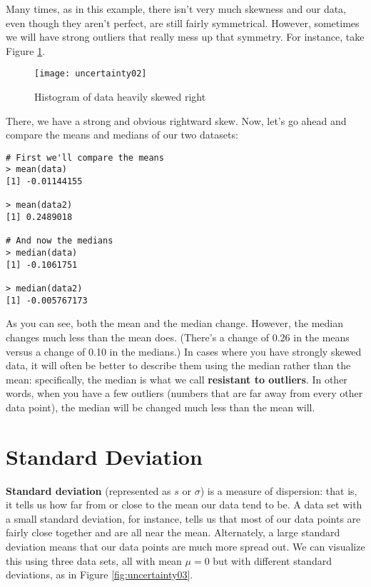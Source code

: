Many times, as in this example, there isn't very much skewness and our data, even though they aren't perfect, are still fairly symmetrical. However, sometimes we will have strong outliers that really mess up that symmetry. For instance, take Figure \ref{fig:uncertainty02}.

\begin{figure}[h!]
\texttt{[image: uncertainty02]}
\caption{Histogram of data heavily skewed right}
\label{fig:uncertainty02}
\end{figure}

There, we have a strong and obvious rightward skew. Now, let's go ahead and compare the means and medians of our two datasets:

\begin{framed}
\begin{Verbatim}[samepage=TRUE]
# First we'll compare the means
> mean(data)
[1] -0.01144155
 
> mean(data2)
[1] 0.2489018
 
# And now the medians
> median(data)
[1] -0.1061751
 
> median(data2)
[1] -0.005767173
\end{Verbatim}
\end{framed}

As you can see, both the mean and the median change. However, the median changes much less than the mean does. (There's a change of 0.26 in the means versus a change of 0.10 in the medians.) In cases where you have strongly skewed data, it will often be better to describe them using the median rather than the mean: specifically, the median is what we call \textbf{resistant to outliers}. In other words, when you have a few outliers (numbers that are far away from every other data point), the median will be changed much less than the mean will.

\section{Standard Deviation}
\textbf{Standard deviation} (represented as $s$ or $\sigma$) is a measure of dispersion: that is, it tells us how far from or close to the mean our data tend to be. A data set with a small standard deviation, for instance, tells us that most of our data points are fairly close together and are all near the mean. Alternately, a large standard deviation means that our data points are much more spread out. We can visualize this using three data sets, all with mean $\mu=0$ but with different standard deviations, as in Figure \ref{fig:uncertainty03}.

